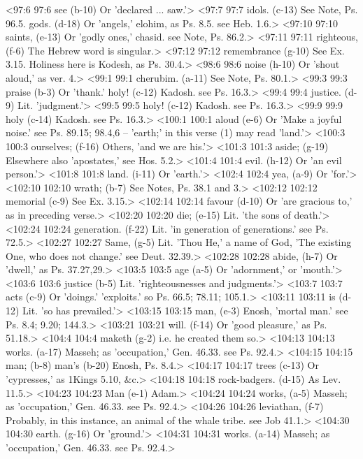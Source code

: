 <97:6 97:6  see (b-10)  Or 'declared ... saw.'>
<97:7 97:7  idols. (c-13)  See Note, Ps. 96.5.
  gods. (d-18)  Or 'angels,' elohim, as Ps. 8.5. see Heb. 1.6.>
<97:10 97:10  saints, (e-13)  Or 'godly ones,' chasid. see Note, Ps. 86.2.>
<97:11 97:11  righteous, (f-6)  The Hebrew word is singular.>
<97:12 97:12  remembrance (g-10)  See Ex. 3.15. Holiness here is Kodesh, as Ps. 30.4.>
<98:6 98:6  noise (h-10)  Or 'shout aloud,' as ver. 4.>
<99:1 99:1  cherubim. (a-11)  See Note, Ps. 80.1.>
<99:3 99:3  praise (b-3)  Or 'thank.'
  holy! (c-12)  Kadosh. see Ps. 16.3.>
<99:4 99:4  justice. (d-9)  Lit. 'judgment.'>
<99:5 99:5  holy! (c-12)  Kadosh. see Ps. 16.3.>
<99:9 99:9  holy (c-14)  Kadosh. see Ps. 16.3.>
<100:1 100:1  aloud (e-6)  Or 'Make a joyful noise.' see Ps. 89.15; 98.4,6 -- 'earth;'  in this verse (1) may read 'land.'>
<100:3 100:3  ourselves; (f-16)  Others, 'and we are his.'>
<101:3 101:3  aside; (g-19)  Elsewhere also 'apostates,' see Hos. 5.2.>
<101:4 101:4  evil. (h-12)  Or 'an evil person.'>
<101:8 101:8  land. (i-11)  Or 'earth.'>
<102:4 102:4  yea, (a-9)  Or 'for.'>
<102:10 102:10  wrath; (b-7)  See Notes, Ps. 38.1 and 3.>
<102:12 102:12  memorial (c-9)  See Ex. 3.15.>
<102:14 102:14  favour (d-10)  Or 'are gracious to,' as in preceding verse.>
<102:20 102:20  die; (e-15)  Lit. 'the sons of death.'>
<102:24 102:24  generation. (f-22)  Lit. 'in generation of generations.' see Ps. 72.5.>
<102:27 102:27  Same, (g-5)  Lit. 'Thou He,' a name of God, 'The existing One, who does  not change.' see Deut. 32.39.>
<102:28 102:28  abide, (h-7)  Or 'dwell,' as Ps. 37.27,29.>
<103:5 103:5  age (a-5)  Or 'adornment,' or 'mouth.'>
<103:6 103:6  justice (b-5)  Lit. 'righteousnesses and judgments.'>
<103:7 103:7  acts (c-9)  Or 'doings.' 'exploits.' so Ps. 66.5; 78.11; 105.1.>
<103:11 103:11  is (d-12)  Lit. 'so has prevailed.'>
<103:15 103:15  man, (e-3)  Enosh, 'mortal man.' see Ps. 8.4; 9.20; 144.3.>
<103:21 103:21  will. (f-14)  Or 'good pleasure,' as Ps. 51.18.>
<104:4 104:4  maketh (g-2)  i.e. he created them so.>
<104:13 104:13  works. (a-17) Masseh; as 'occupation,' Gen. 46.33. see Ps. 92.4.>
<104:15 104:15  man; (b-8)  man's (b-20)
  Enosh, Ps. 8.4.>
<104:17 104:17  trees (c-13)  Or 'cypresses,' as 1Kings 5.10, &c.>
<104:18 104:18  rock-badgers. (d-15)  As Lev. 11.5.>
<104:23 104:23  Man (e-1)  Adam.>
<104:24 104:24  works, (a-5) Masseh; as 'occupation,' Gen. 46.33. see Ps. 92.4.>
<104:26 104:26  leviathan, (f-7)  Probably, in this instance, an animal of the whale tribe. see  Job 41.1.>
<104:30 104:30  earth. (g-16)  Or 'ground.'>
<104:31 104:31  works. (a-14)  Masseh; as 'occupation,' Gen. 46.33. see Ps. 92.4.>
